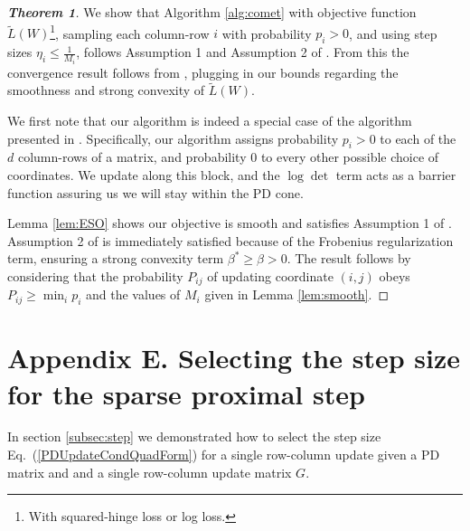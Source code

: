 \documentclass[twoside,11pt]{article}
\newcommand\mat[1]{{#1}}
\newcommand{\W}{\mat{W}}
\newcommand{\Pp}{\mat{P}}
\newcommand{\tL}{\tilde{L}(\W)}
\renewcommand{\eqref}[1]{Eq.~(\ref{#1})}
\begin{document}

\begin{proof}[{\bf{Theorem 1}}]
We show that Algorithm \ref{alg:comet} with objective function $\tL$\footnote{With squared-hinge loss or log loss.}, sampling each column-row $i$ with probability $p_i >0$, and using step sizes $\eta_i \leq \frac{1}{M_i}$, follows Assumption 1 and Assumption 2 of \citet{richtarik2013optimal}. From this the convergence result follows from \citeauthor[Theorem 3]{richtarik2013optimal}, plugging in our bounds regarding the smoothness and strong convexity of $\tL$.

We first note that our algorithm is indeed a special case of the algorithm presented in \citet{richtarik2013optimal}. Specifically, our algorithm assigns probability $p_i > 0 $ to each of the $d$ column-rows of a matrix, and probability $0$ to every other possible choice of coordinates. We update along this block, and the $\log \det$ term acts as a barrier function
assuring us we will stay within the PD cone.

Lemma \ref{lem:ESO} shows our objective is smooth and satisfies Assumption 1 of \citeauthor{richtarik2013optimal}. Assumption 2 of \citeauthor{richtarik2013optimal} is immediately satisfied because of the Frobenius regularization term, ensuring a strong convexity term $\beta^* \geq \beta > 0$. The result follows by considering that the probability $\Pp_{ij}$ of updating coordinate $(i,j)$ obeys $\Pp_{ij} \geq \min_i p_i $ and the values of $M_i$ given in Lemma \ref{lem:smooth}.

\end{proof}

\section*{Appendix E. Selecting the step size for the sparse proximal step}
In section \ref{subsec:step} we demonstrated how to select the step size \eqref{PDUpdateCondQuadForm} for a single row-column update given a PD matrix and and a single row-column update matrix $\mat{G}$. 
\end{document}
